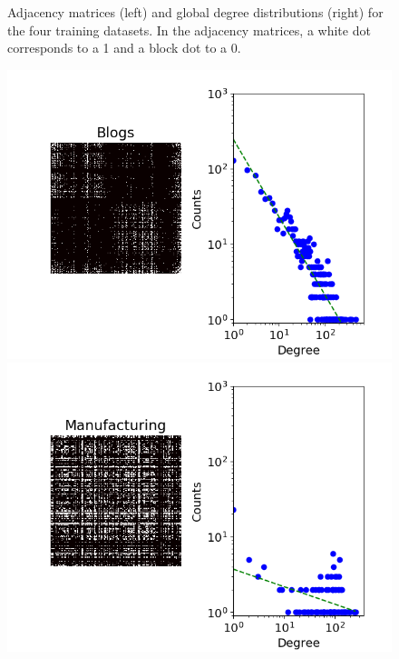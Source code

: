\documentclass[french]{hermes-journal}
\begin{document}
\begin{figure}[h] {Adjacency matrices (left) and global degree distributions (right) for the four training datasets. In the adjacency matrices, a white dot corresponds to a 1 and a block dot to a 0.}
\begin{minipage}{0.4\textwidth}
            \includegraphics[width=1.1\textwidth]{img/corpus/blogs_dd}
        \end{minipage}
        \begin{minipage}{0.4\textwidth}
            \includegraphics[width=1.1\textwidth]{img/corpus/manufacturing_dd}
        \end{minipage}
	\label{fig:corpuses}
\end{figure}
\end{document}
